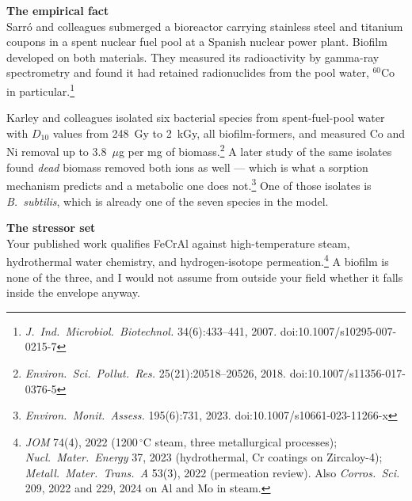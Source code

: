 \documentclass[landscape,12pt]{article}
\begin{document}
\vspace{2mm}
\begin{minipage}[t]{0.485\linewidth}
{\large\bfseries\color{bench} The empirical fact}\\[3pt]
Sarr\'{o} and colleagues submerged a bioreactor carrying stainless steel and titanium coupons in
a spent nuclear fuel pool at a Spanish nuclear power plant. Biofilm developed on both materials.
They measured its radioactivity by gamma-ray spectrometry and found it had retained radionuclides
from the pool water, $^{60}$Co in particular.\footnote{\textit{J.\ Ind.\ Microbiol.\ Biotechnol.}
34(6):433--441, 2007. doi:10.1007/s10295-007-0215-7}

\vspace{2mm}
Karley and colleagues isolated six bacterial species from spent-fuel-pool water with $D_{10}$
values from 248~Gy to 2~kGy, all biofilm-formers, and measured Co and Ni removal up to
3.8~$\mu$g per mg of biomass.\footnote{\textit{Environ.\ Sci.\ Pollut.\ Res.}
25(21):20518--20526, 2018. doi:10.1007/s11356-017-0376-5} A later study of the same isolates
found \emph{dead} biomass removed both ions as well --- which is what a sorption mechanism
predicts and a metabolic one does not.\footnote{\textit{Environ.\ Monit.\ Assess.} 195(6):731,
2023. doi:10.1007/s10661-023-11266-x} One of those isolates is \textit{B.\ subtilis}, which is
already one of the seven species in the model.

\vspace{3mm}
{\large\bfseries\color{bench} The stressor set}\\[3pt]
Your published work qualifies FeCrAl against high-temperature steam, hydrothermal water
chemistry, and hydrogen-isotope permeation.\footnote{\textit{JOM} 74(4), 2022
(1200\,$^\circ$C steam, three metallurgical processes); \textit{Nucl.\ Mater.\ Energy} 37, 2023
(hydrothermal, Cr coatings on Zircaloy-4); \textit{Metall.\ Mater.\ Trans.\ A} 53(3), 2022
(permeation review). Also \textit{Corros.\ Sci.} 209, 2022 and 229, 2024 on Al and Mo in steam.}
A biofilm is none of the three, and I would not assume from outside your field whether it falls
inside the envelope anyway.
\end{minipage}\hfill
\end{document}
